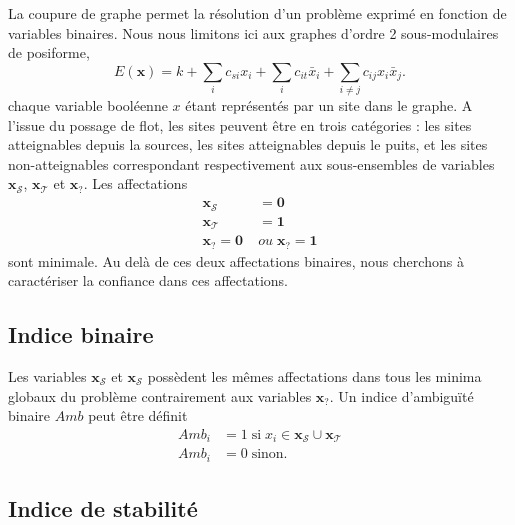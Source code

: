 \documentclass[../main/These_Mathias_Paget.tex]{subfiles}
\begin{document}
La coupure de graphe permet la résolution d'un problème exprimé en fonction de variables binaires. Nous nous limitons ici aux graphes d'ordre 2 sous-modulaires de posiforme,
\begin{equation}
			E(\boldsymbol{x})= k + \sum_i{c_{si}x_i} + \sum_i{c_{it}\bar{x}_i} + \sum_{i \neq j}{ c_{ij}x_i\bar{x}_j }.
\end{equation}
chaque variable booléenne $x$ étant représentés par un site dans le graphe. A l'issue du possage de flot, les sites peuvent être en trois catégories : les sites atteignables depuis la sources, les sites atteignables depuis le puits, et les sites non-atteignables correspondant respectivement aux sous-ensembles de variables $ \boldsymbol{x}_\mathcal{S}$, $\boldsymbol{x}_\mathcal{T}$ et $\boldsymbol{x}_{?}$. Les affectations
\begin{equation}
\begin{aligned}
\boldsymbol{x}_\mathcal{S} &= \boldsymbol{0} \\
\boldsymbol{x}_\mathcal{T} &= \boldsymbol{1} \\
\boldsymbol{x}_\mathcal{?} = \boldsymbol{0} \; & ou \; \boldsymbol{x}_\mathcal{?} = \boldsymbol{1}
\end{aligned}
\end{equation}
sont minimale. Au delà de ces deux affectations binaires, nous cherchons à caractériser la confiance dans ces affectations.


\subsection{Indice binaire}

Les variables $\boldsymbol{x}_\mathcal{S}$ et $\boldsymbol{x}_\mathcal{S}$ possèdent les mêmes affectations dans tous les minima globaux du problème contrairement aux variables  $\boldsymbol{x}_\mathcal{?}$. Un indice d’ambiguïté binaire $Amb$ peut être définit
\begin{equation}
\begin{aligned}
Amb_i & = 1 \; \text{si} \; x_i \in \boldsymbol{x}_\mathcal{S} \cup \boldsymbol{x}_\mathcal{T} \\
Amb_i &= 0 \; \text{sinon}.
\end{aligned}
\end{equation}

\subsection{Indice de stabilité}
\end{document}
